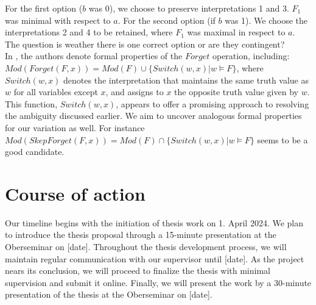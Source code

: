 \documentclass[f,proposal,palatino]{AIGpaper}
\begin{document}
\noindent For the first option ($b$ was 0), we choose to preserve interpretations 1 and 3. $F_1$ was minimal with respect to $a$. For the second option (if $b$ was 1). We choose the interpretations 2 and 4 to be retained, where $F_1$ was maximal in respect to $a$. The question is weather there is one correct option or are they contingent?\\

In \cite{lang2003propositional}, the authors denote formal properties of the $\mathit{Forget}$ operation, including: $Mod(Forget(F, x)) = Mod(F) \cup \{Switch(w, x) | w \models F\}$, where $Switch(w, x)$ denotes the interpretation that maintains the same truth value as $w$ for all variables except $x$, and assigns to $x$ the opposite truth value given by $w$. This function, $Switch(w, x)$, appears to offer a promising approach to resolving the ambiguity discussed earlier.
We aim to uncover analogous formal properties for our variation as well. For instance $Mod(SkepForget(F, x)) = Mod(F) \cap \{Switch(w, x) | w \models F\}$ seems to be a good candidate.

\section{Course of action}
Our timeline begins with the initiation of thesis work on 1. April 2024. We plan to introduce the thesis proposal through a 15-minute presentation at the Oberseminar on [date]. Throughout the thesis development process, we will maintain regular communication with our supervisor until [date]. As the project nears its conclusion, we will proceed to finalize the thesis with minimal supervision and submit it online. Finally, we will present the work by a 30-minute presentation of the thesis at the Oberseminar on [date].




\end{document}
